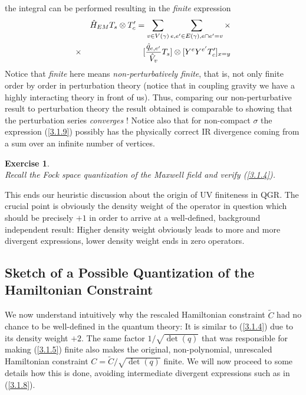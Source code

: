 \documentclass[12pt]{report}
\newtheorem{Exercise}{Exercise}[section]
\def\ba{\begin{eqnarray}}
\def\ea{\end{eqnarray}}
\def\blue{\relax}
\def\green{\relax}
\begin{document}
\begin{itemize}
the integral can be performed resulting in the {\it finite} expression
\ba \label{3.1.9}
&& \hat{H}_{EM} T_s\otimes T'_c
= \sum_{v\in V(\gamma)}\sum_{e,e'\in E(\gamma),e\cap e'=v} \times
\nonumber\\
&\times & 
[{\blue \frac{\hat{q}_{e,e'}}{\hat{V}_v}} T_s]
\otimes
[{\green Y^e Y^{e'}} T'_c]_{x=y}
\ea 
Notice that {\it finite} here means {\it non-perturbatively finite}, 
that is, not only finite order by order in perturbation theory
(notice that in coupling gravity we have a highly interacting theory in 
front of us). Thus, comparing our non-perturbative result to perturbation
theory the result obtained is comparable to showing that the perturbation 
series {\it converges} ! Notice also that for non-compact $\sigma$ 
the expression (\ref{3.1.9}) possibly has the physically correct
IR divergence coming from a sum over an infinite number of vertices.
%
\end{itemize}
%
\begin{Exercise} \label{ex3.1.2} ~~~~~\\
Recall the Fock space quantization of the Maxwell field and verify 
(\ref{3.1.4}).
\end{Exercise}
%
This ends our heuristic discussion about the origin of UV finiteness in 
QGR. The crucial point is obviously the density weight of the operator
in question which should be precisely $+1$ in order to arrive at a 
well-defined, background independent result: Higher density weight 
obviously leads to more and more divergent expressions, lower density 
weight ends in zero operators. 

\subsection{Sketch of a Possible Quantization of the Hamiltonian
Constraint}
\label{s3.1.2}

We now understand intuitively why the rescaled 
Hamiltonian constraint $\tilde{C}$ had no chance to be well-defined in the 
quantum theory: It is similar to (\ref{3.1.4}) due to its density weight 
$+2$. The same factor $1/\sqrt{\det(q)}$ that was responsible for making 
(\ref{3.1.5}) finite also makes the original, non-polynomial, unrescaled  
Hamiltonian constraint $C=\tilde{C}/\sqrt{\det(q)}$ finite. We will 
now proceed to some details how this is done, avoiding intermediate 
divergent expressions such as in (\ref{3.1.8}). 
\end{document}
